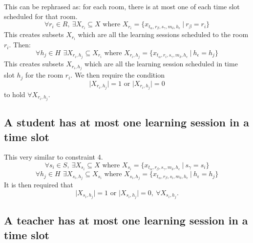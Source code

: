 This can be rephrased as: for each room, there is at most one of each time slot 
scheduled for that room.
\begin{equation*}
	\forall r_i \in R, \: \exists X_{r_i} \subseteq X \text{ where } X_{r_i} = 
	\{ x_{t_{\alpha},r_{\beta},s_{\gamma},m_{\delta},h_{\epsilon}} \: | \: 
	r_{\beta} = r_i\}
\end{equation*}
This creates subsets \( X_{r_i} \) which are all the learning sessions scheduled
to the room \( r_i \). Then:
\begin{equation*}
	\forall h_j \in H\, \: \exists X_{r_i,h_j} \subseteq X_{r_i} \text{ where }
	X_{r_i,h_j} = \{ x_{t_{\alpha}, r_i, s_{\gamma}, m_{\delta}, h_{\epsilon}} 
	\: | \: h_{\epsilon} = h_j \}
\end{equation*}
This creates subsets \( X_{r_i,h_j} \) which are all the learning session 
scheduled in time slot \( h_j \) for the room \( r_i \). We then require the 
condition
\begin{equation*}
	\lvert X_{r_i,h_j} \rvert = 1 \text{ or } \lvert X_{r_i,h_j} \rvert = 0
\end{equation*}
to hold \( \forall X_{r_i,h_j} \).

\subsection{A student has at most one learning session in a time slot}

This very similar to constraint 4.
\begin{equation*}
	\forall s_i \in S, \: \exists X_{s_i} \subseteq X \text{ where } X_{s_i} = 
	\{ x_{t_{\alpha},r_{\beta},s_{\gamma},m_{\delta},h_{\epsilon}} \: | \: 
	s_{\gamma} = s_i\}
\end{equation*}
\begin{equation*}
	\forall h_j \in H\, \: \exists X_{s_i,h_j} \subseteq X_{s_i} \text{ where }
	X_{s_i,h_j} = \{ x_{t_{\alpha}, r_{\beta}, s_i, m_{\delta}, h_{\epsilon}} 
	\: | \: h_{\epsilon} = h_j \}
\end{equation*}
It is then required that
\begin{equation*}
	\lvert X_{s_i,h_j} \rvert = 1 \text{ or } \lvert X_{s_i,h_j} \rvert = 0, \: 
	\forall X_{s_i,h_j}.
\end{equation*}

\subsection{A teacher has at most one learning session in a time slot}

